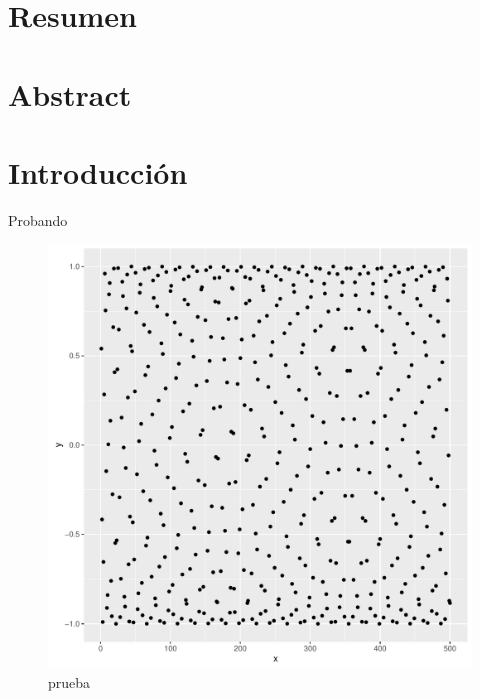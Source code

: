 \documentclass[a4paper,11pt]{book}\usepackage[]{graphicx}\usepackage[]{color}
\makeatletter
\def\maxwidth{ %
  \ifdim\Gin@nat@width>\linewidth
    \linewidth
  \else
    \Gin@nat@width
  \fi
}
\newenvironment{knitrout}{}{} %
\theoremstyle{plain}
\theoremstyle{definition}
\makeatother
\begin{document}
%
%
\tableofcontents
%




\chapter{Resumen}


\chapter{Abstract}


\chapter{Introducción}


Probando

\begin{knitrout}
\color{fgcolor}\begin{figure}

{\centering \includegraphics[width=\maxwidth]{figure/prueba-1} 

}

\caption[prueba]{prueba}\label{fig:prueba}
\end{figure}


\end{knitrout}
\end{document}
